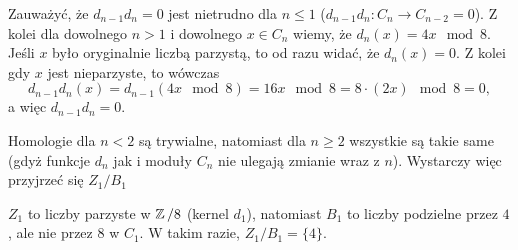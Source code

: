 \begin{solution}
  Zauważyć, że $d_{n-1}d_n=0$ jest nietrudno dla $n\leq1$ ($d_{n-1}d_n:C_n\to C_{n-2}=0$). Z kolei dla dowolnego $n>1$ i dowolnego $x\in C_n$ wiemy, że $d_n(x)=4x\mod 8$. Jeśli $x$ było oryginalnie liczbą parzystą, to od razu widać, że $d_n(x)=0$. Z kolei gdy $x$ jest nieparzyste, to wówczas 
  $$d_{n-1}d_n(x)=d_{n-1}(4x\mod 8)=16x\mod 8=8\cdot(2x)\mod 8=0,$$
  a więc $d_{n-1}d_n=0$.

  Homologie dla $n<2$ są trywialne, natomiast dla $n\geq 2$ wszystkie są takie same (gdyż funkcje $d_n$ jak i moduły $C_n$ nie ulegają zmianie wraz z $n$). Wystarczy więc przyjrzeć się $Z_1/B_1$
  
  \begin{center}\end{center}

  $Z_1$ to liczby parzyste w $\operatorname{\mathbb{Z}}/8$ (kernel $d_1$), natomiast $B_1$ to liczby podzielne przez $4$, ale nie przez $8$ w $C_1$. W takim razie, $Z_1/B_1=\{4\}$.
\end{solution}

